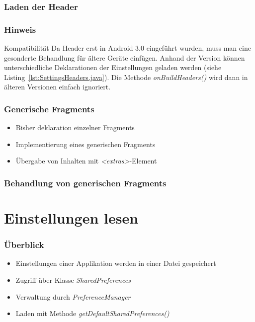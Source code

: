 \begin{frame}
   \frametitle{Laden der Header}
   
\end{frame}

\begin{frame}
   \frametitle{Hinweis}
   \begin{alertblock}{Kompatibilität}
		Da Header erst in Android 3.0 eingeführt wurden, muss man eine gesonderte Behandlung 
		für ältere Geräte einfügen. Anhand der Version können unterschiedliche Deklarationen 
		der Einstellungen geladen werden (siehe Listing~\ref{lst:SettingsHeaders.java}). 
		Die Methode \emph{onBuildHeaders()} wird dann in älteren Versionen einfach ignoriert.
   \end{alertblock}
\end{frame}

\begin{frame}
   \frametitle{Generische Fragments}
   \begin{itemize}
      \item Bisher deklaration einzelner Fragments
      \item Implementierung eines generischen Fragments
      \item Übergabe von Inhalten mit \emph{\textless{}extras\textgreater}-Element
   \end{itemize}

   
\end{frame}

\begin{frame}
   \frametitle{Behandlung von generischen Fragments}
   
\end{frame}

\section{Einstellungen lesen}
\begin{frame}
   \frametitle{Überblick}
   \begin{itemize}
      \item Einstellungen einer Applikation werden in einer Datei gespeichert
      \item Zugriff über Klasse \emph{SharedPreferences} 
      \item Verwaltung durch \emph{PreferenceManager}
      \item Laden mit Methode \emph{getDefaultSharedPreferences()} 
   \end{itemize}

   
\end{frame}

